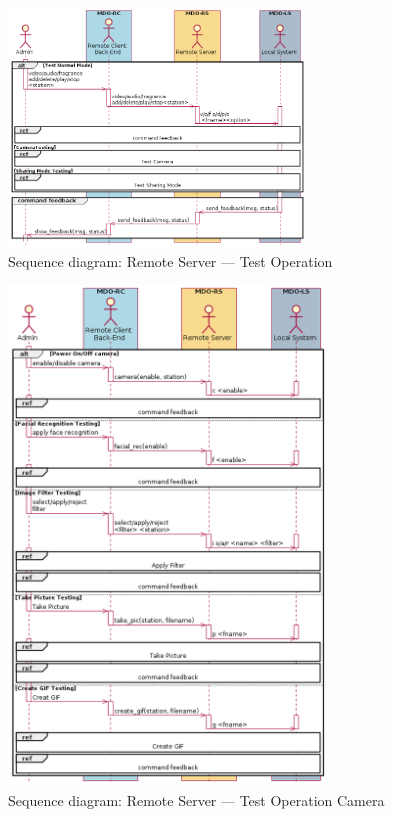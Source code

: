 \begin{figure}[htb!]
  \centering
  \includegraphics[width=0.7\textwidth]{img/seq-rs-test-op.png}%
  \caption{Sequence diagram: Remote Server --- Test Operation}%
  \label{fig:seq-rs-test-op}
\end{figure}

\begin{figure}[htb!]
  \centering
  \includegraphics[width=0.75\textwidth]{img/seq-rs-test-op-camera.png}%
  \caption{Sequence diagram: Remote Server --- Test Operation Camera}%
  \label{fig:seq-rs-test-op-camera}
\end{figure}

